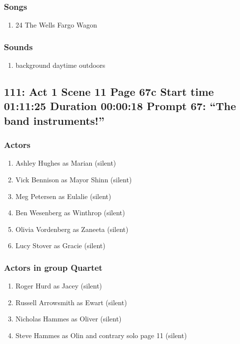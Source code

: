 \subsubsection{Songs}
\begin{enumerate}
\item 24 The Wells Fargo Wagon
\end{enumerate}\subsubsection{Sounds}
\begin{enumerate}
\item background daytime outdoors
\end{enumerate}
\subsection{111: Act 1 Scene 11 Page 67c Start time 01:11:25 Duration 00:00:18 Prompt 67: ``The band instruments!''}

\subsubsection{Actors}
\begin{enumerate}
\item Ashley Hughes as Marian (silent)
\item Vick Bennison as Mayor Shinn (silent)
\item Meg Petersen as Eulalie (silent)
\item Ben Wesenberg as Winthrop (silent)
\item Olivia Vordenberg as Zaneeta (silent)
\item Lucy Stover as Gracie (silent)
\end{enumerate}
\subsubsection{Actors in group Quartet}
\begin{enumerate}
\item Roger Hurd as Jacey (silent)
\item Russell Arrowsmith as Ewart (silent)
\item Nicholas Hammes as Oliver (silent)
\item Steve Hammes as Olin and contrary solo page 11 (silent)
\end{enumerate}
